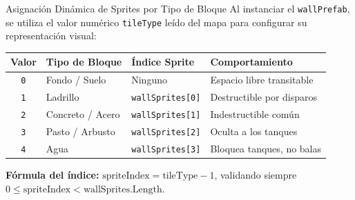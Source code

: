 \documentclass{beamer}
\begin{document}
\begin{frame}{Asignaci\'on Din\'amica de Sprites por Tipo de Bloque}
  Al instanciar el \texttt{wallPrefab}, se utiliza el valor num\'erico \texttt{tileType} le\'ido del mapa para configurar su representaci\'on visual:

  \vspace{0.3cm}
  \begin{table}
    \centering
    \begin{tabular}{|c|l|l|l|}
      \hline
      \textbf{Valor} & \textbf{Tipo de Bloque} & \textbf{\'Indice Sprite} & \textbf{Comportamiento} \\ \hline
      \texttt{0} & Fondo / Suelo & Ninguno & Espacio libre transitable \\ \hline
      \texttt{1} & Ladrillo & \texttt{wallSprites[0]} & Destructible por disparos \\ \hline
      \texttt{2} & Concreto / Acero & \texttt{wallSprites[1]} & Indestructible com\'un \\ \hline
      \texttt{3} & Pasto / Arbusto & \texttt{wallSprites[2]} & Oculta a los tanques \\ \hline
      \texttt{4} & Agua & \texttt{wallSprites[3]} & Bloquea tanques, no balas \\ \hline
    \end{tabular}
  \end{table}

  \vspace{0.3cm}
  \textbf{F\'ormula del \'indice:} $\text{spriteIndex} = \text{tileType} - 1$, validando siempre $0 \le \text{spriteIndex} < \text{wallSprites.Length}$.
\end{frame}
\end{document}
